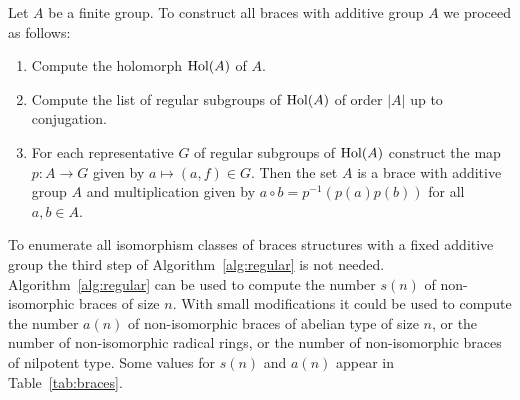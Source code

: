 \begin{steps}
	\label{alg:regular}
	Let $A$ be a finite group.  To construct all braces with additive group  
	$A$ we proceed as follows:
	\begin{enumerate}
		\item Compute the holomorph $\operatorname{Hol}(A)$ of $A$.
		\item Compute the list of regular subgroups of $\operatorname{Hol}(A)$ of
			order $|A|$ up to conjugation. 
		\item For each representative $G$ of regular subgroups of
			$\operatorname{Hol}(A)$ construct the map $p\colon A\to G$ given by $a\mapsto
            (a,f)\in G$. Then the set $A$ is a brace with additive 
			group $A$ and 
			multiplication given by 
			$a \circ b=p^{-1}(p(a)p(b))$ for all $a,b\in A$.
	\end{enumerate}
\end{steps}

To enumerate all isomorphism classes of braces structures with a fixed additive group  
the third step of Algorithm~\ref{alg:regular} is not needed. 
Algorithm~\ref{alg:regular} can be used to compute
the number $s(n)$ of non-isomorphic braces of size $n$. With small modifications
it could be used to compute the number 
$a(n)$ of non-isomorphic braces of abelian type of size $n$, or the number of non-isomorphic radical rings, or the 
number of non-isomorphic braces of nilpotent type. Some
values for $s(n)$ and $a(n)$ appear in Table~\ref{tab:braces}. 



